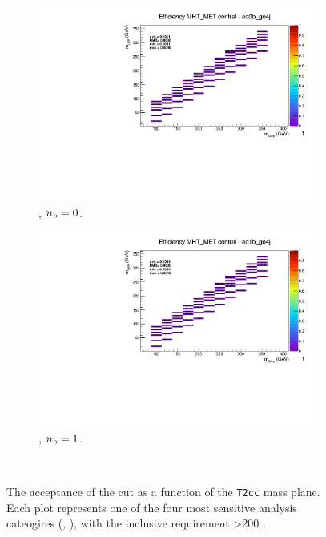 \begin{figure}[h!]
\begin{subfigure}[b]{0.4\textwidth}
    \includegraphics[width=\textwidth, page=5]{Figs/sms/t2cc/v37_2/systs/T2cc_MHT_MET_eq0b_ge4j.pdf}
    \caption{\njhigh, $n_{\text{b}} = 0$.}
  \end{subfigure}
  \begin{subfigure}[b]{0.4\textwidth}
    \includegraphics[width=\textwidth, page=5]{Figs/sms/t2cc/v37_2/systs/T2cc_MHT_MET_eq1b_ge4j.pdf}
    \caption{\njhigh, $n_{\text{b}} = 1$.}
  \end{subfigure}\\
  \caption{The acceptance of the \mhtmet cut as a function of the \texttt{T2cc}
  mass plane. Each plot represents one of the four most sensitive 
  analysis cateogires (\nb, \nj), with the inclusive requirement \HT>200 \gev.}
  \label{fig:sms-mhtmet-t2cc}
\end{figure}


